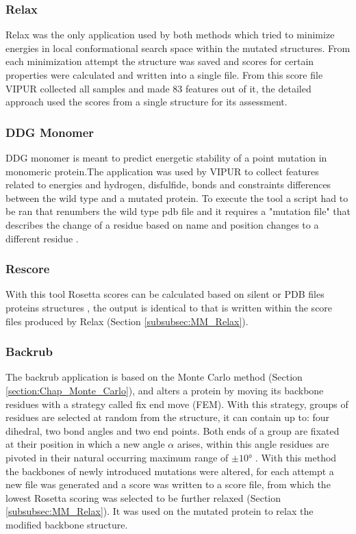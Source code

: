 \subsubsection{Relax}
Relax was the only application used by both methods which tried to minimize energies in local conformational search space \cite{} within the mutated structures. From each minimization attempt the structure was saved and scores for certain properties were calculated and written into a single file. From this score file VIPUR collected all samples and made 83 features out of it, the detailed approach used the scores from a single structure for its assessment.
\label{subsubsec:MM_Relax}

\subsubsection{DDG Monomer}
DDG monomer is meant to predict energetic stability of a point mutation in  monomeric protein.The application was used by VIPUR to collect features related to energies and hydrogen, disfulfide, bonds and constraints differences between the wild type and a mutated protein. To execute the tool a script had to be ran that renumbers the wild type pdb file and it requires a "mutation file" that describes the change of a residue based on name and position changes to a different residue \cite{}.
\label{subsubsec:MM_DDG_Monomer}

\subsubsection{Rescore}
With this tool Rosetta scores can be calculated based on silent or PDB files proteins structures \cite{} , the output is identical to that is written within the score files produced by Relax (Section \ref{subsubsec:MM_Relax}).
\label{subsubsec:MM_Rescore}

\subsubsection{Backrub}
The backrub application is based on the Monte Carlo method (Section \ref{section:Chap_Monte_Carlo}), and alters a protein by moving its backbone residues with a strategy called fix end move (FEM). With this strategy, groups of residues are selected at random from the structure, it can contain up to: four dihedral, two bond angles and two end points. Both ends of a group are fixated at their position in which a new angle $\alpha$ arises, within this angle residues are pivoted in their natural occurring maximum range of $\pm \ang{10}$ \cite{}.
With this method the backbones of newly introduced mutations were altered, for each attempt a new file was generated and a score was written to a score file, from which the lowest Rosetta scoring was selected to be further relaxed (Section \ref{subsubsec:MM_Relax}).
It was used on the mutated protein to relax the modified backbone structure.
\label{subsubsec:MM_Backrub}


